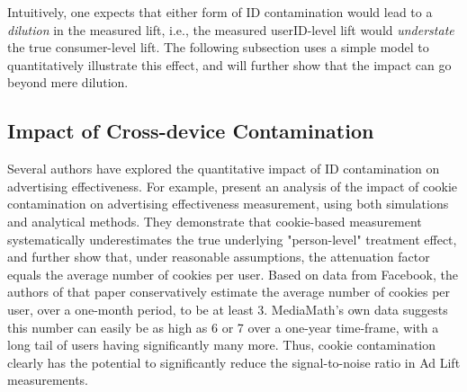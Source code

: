 \documentclass[11pt,a4paper]{article}
\theoremstyle{definition}
\theoremstyle{remark}
\theoremstyle{definition}
\theoremstyle{definition}
\theoremstyle{definition}
\theoremstyle{definition}
\theoremstyle{definition}
\theoremstyle{definition}
\begin{document}
Intuitively, one expects that either form of ID contamination would lead to a \textit{dilution} in the measured lift, i.e., the measured userID-level lift would \textit{understate} the true consumer-level lift. The following subsection uses a simple model to quantitatively illustrate this effect, and will further show that the impact can go beyond mere dilution.

\subsection{Impact of Cross-device Contamination}
Several authors have explored the quantitative impact of ID contamination on advertising effectiveness. For example, \cite{coey2016people} present an analysis of the impact of cookie contamination on advertising effectiveness measurement, using both simulations and analytical methods. They demonstrate that cookie-based measurement systematically underestimates the true underlying "person-level" treatment effect, and further show that, under reasonable assumptions, the attenuation factor equals the average number of cookies per user. Based on data from Facebook, the authors of that paper conservatively estimate the average number of cookies per user, over a one-month period, to be at least 3. MediaMath's own data suggests this number can easily be as high as 6 or 7 over a one-year time-frame, with a long tail of users having significantly many more. Thus, cookie contamination clearly has the potential to significantly reduce the signal-to-noise ratio in Ad Lift measurements.
\end{document}
